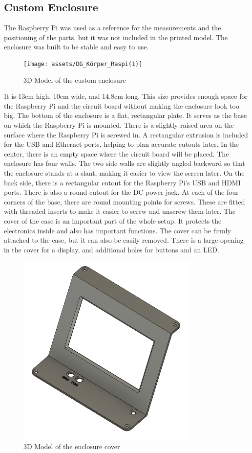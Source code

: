 \subsection{Custom Enclosure}
The Raspberry Pi was used as a reference for the measurements and the positioning of the parts, but it was not included in the printed model.
The enclosure was built to be stable and easy to use.

\begin{figure}[H]
  \centering
  \texttt{[image: assets/DG\_Körper\_Raspi(1)]}
  \caption{3D Model of the custom enclosure}
\end{figure}

It is 13cm high, 10cm wide, and 14.8cm long. This size provides enough space for the Raspberry Pi and the circuit board without making the enclosure look too big.
The bottom of the enclosure is a flat, rectangular plate. It serves as the base on which the Raspberry Pi is mounted. There is a slightly raised area on the surface where the Raspberry Pi is screwed in. A rectangular extrusion is included for the USB and Ethernet ports, helping to plan accurate cutouts later. In the center, there is an empty space where the circuit board will be placed.
The enclosure has four walls. The two side walls are slightly angled backward so that the enclosure stands at a slant, making it easier to view the screen later. On the back side, there is a rectangular cutout for the Raspberry Pi’s USB and HDMI ports. There is also a round cutout for the DC power jack.
At each of the four corners of the base, there are round mounting points for screws. These are fitted with threaded inserts to make it easier to screw and unscrew them later.
The cover of the case is an important part of the whole setup. It protects the electronics inside and also has important functions. The cover can be firmly attached to the case, but it can also be easily removed. There is a large opening in the cover for a display, and additional holes for buttons and an LED.

\begin{figure}[H]
  \centering
  \includegraphics[width=0.8\textwidth]{assets/DG_Deckel(1)}
  \caption{3D Model of the enclosure cover}
\end{figure}

